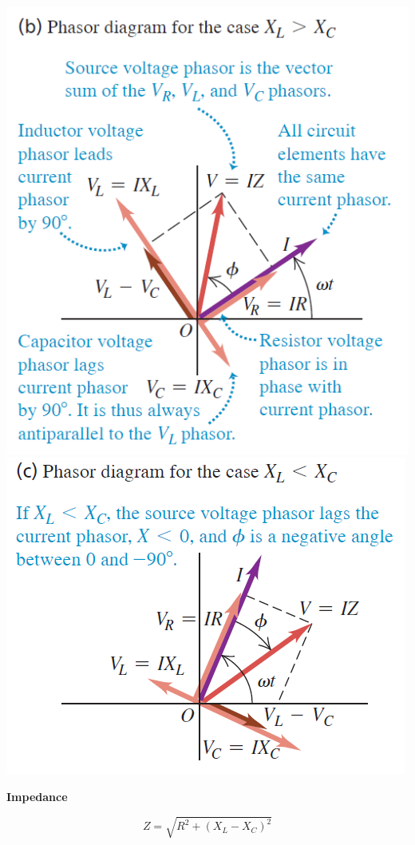 \documentclass[10pt]{article}
\newcommand\heading[1]{\medskip\textbf{#1}\medskip}
\begin{document}
\begin{multicols*}{3}
\includegraphics[scale=0.3]{images/fs_rlc_phasor_1.png}
\includegraphics[scale=0.35]{images/fs_rlc_phasor_2.png}

\heading{Impedance}

\[Z=\sqrt{R^2+(X_L-X_C)^2}\]


\end{multicols*}
\end{document}
